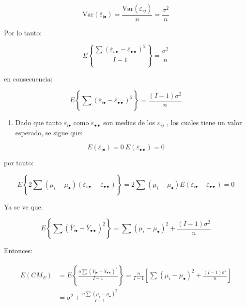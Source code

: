 \documentclass[]{book}
\providecommand{\tightlist}{%
  \setlength{\itemsep}{0pt}\setlength{\parskip}{0pt}}
\theoremstyle{definition}
\theoremstyle{definition}
\theoremstyle{definition}
\theoremstyle{remark}
\begin{document}
\[
\text{Var}\left( {\overline{\varepsilon}}_{\text{i}\bullet} \right) = \frac{\text{Var}\left( \varepsilon_{ij} \right)}{n} = \frac{\sigma^{2}}{n}
\]

Por lo tanto:

\[
E\left\{ \frac{\sum_{}^{}\left( {\overline{\varepsilon}}_{i\bullet} - {\overline{\varepsilon}}_{\bullet\bullet} \right)^{2}}{I - 1} \right\} = \frac{\sigma^{2}}{n}
\]

en consecuencia:

\[
E\left\{ \sum_{}^{}\left( {\overline{\varepsilon}}_{\text{i}\bullet} - {\overline{\varepsilon}}_{\bullet \bullet} \right)^{2} \right\} = \frac{\left( I - 1 \right)\sigma^{2}}{n}
\]

\begin{enumerate}
\def\labelenumi{\arabic{enumi}.}
\setcounter{enumi}{4}
\tightlist
\item
  Dado que tanto \({\overline{\varepsilon}}_{\text{i}\bullet}\) como
  \({\overline{\varepsilon}}_{\bullet\bullet}\) son medias de los
  \(\varepsilon_{ij}\) , los cuales tiene un valor esperado, se sigue
  que:
\end{enumerate}

\[
E\left( {\overline{\varepsilon}}_{\text{i}\bullet} \right) = 0\ E\left( {\overline{\varepsilon}}_{\bullet \bullet} \right) = 0
\]

por tanto:

\[
E\left\{ 2\sum_{}^{}{\left( \mu_{i} - \mu_{\bullet} \right)\left( {\overline{\varepsilon}}_{i\bullet} - {\overline{\varepsilon}}_{\bullet \bullet} \right)} \right\} = 2\sum_{}^{}\left( \mu_{i} - \mu_{\bullet} \right)E\left( {\overline{\varepsilon}}_{\text{i}\bullet} - {\overline{\varepsilon}}_{\bullet \bullet} \right) = 0
\]

Ya se ve que:

\[
E\left\{ \sum_{}^{}\left( {\overline{Y}}_{\text{i}\bullet} - {\overline{Y}}_{\bullet\bullet} \right)^{2} \right\} = \sum_{}^{}\left( \mu_{i} - \mu_{\bullet} \right)^{2} + \frac{\left( I - 1 \right)\sigma^{2}}{n}
\]

Entonces:

\[
\begin{matrix}
\begin{split}
E\left( CM_E \right)& = E\left\{ \frac{n\sum_{}^{}\left( {\overline{Y}}_{\text{i}\bullet} - {\overline{Y}}_{\bullet \bullet} \right)^{2}}{I - 1} \right\} = \frac{n}{I - 1}\left\lbrack \sum_{}^{}{\left( \mu_{i} - \mu_{\bullet} \right)^{2} + \frac{\left( I - 1 \right)\sigma^{2}}{n}} \right\rbrack \\
& = \sigma^{2} + \frac{n\sum_{}^{}\left( \mu_{i} - \mu_{\bullet} \right)^{2}}{I - 1} \\
\end{split} \\
 \\
\end{matrix}
\]
\end{document}
